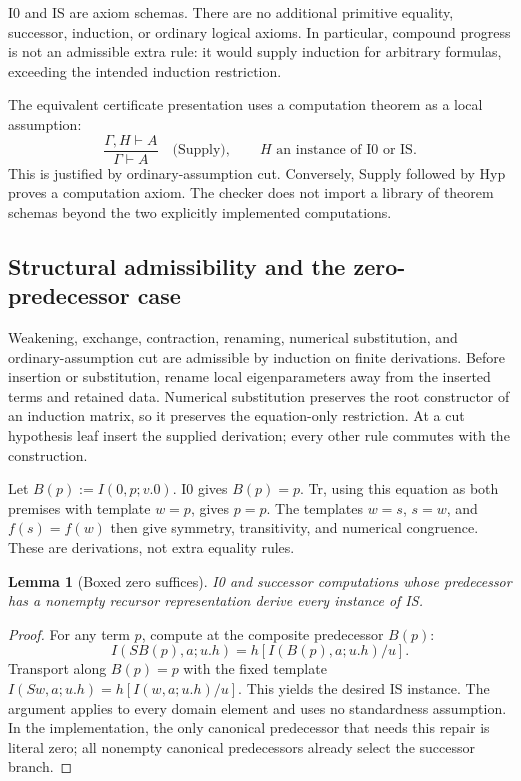 \documentclass[11pt,letterpaper]{article}
\newtheorem{lemma}[theorem]{Lemma}
\theoremstyle{definition}\newtheorem{definition}[theorem]{Definition}
\theoremstyle{remark}\newtheorem{remark}[theorem]{Remark}
\begin{document}
I0 and IS are axiom schemas. There are no additional primitive equality,
successor, induction, or ordinary logical axioms. In particular, compound
progress is not an admissible extra rule: it would supply induction for
arbitrary formulas, exceeding the intended induction restriction.

The equivalent certificate presentation uses a computation theorem as a
local assumption:
\[
 \frac{\Gamma,H\vdash A}{\Gamma\vdash A}\quad\text{(Supply)},
 \qquad H\text{ an instance of I0 or IS}.
\]
This is justified by ordinary-assumption cut. Conversely, Supply followed
by Hyp proves a computation axiom. The checker does not import a library
of theorem schemas beyond the two explicitly implemented computations.

\subsection{Structural admissibility and the zero-predecessor case}

Weakening, exchange, contraction, renaming, numerical substitution, and
ordinary-assumption cut are admissible by induction on finite derivations.
Before insertion or substitution, rename local eigenparameters away from
the inserted terms and retained data. Numerical substitution preserves
the root constructor of an induction matrix, so it preserves the
equation-only restriction. At a cut hypothesis leaf insert the supplied
derivation; every other rule commutes with the construction.

Let $B(p):=I(0,p;v.0)$. I0 gives $B(p)=p$. Tr, using this equation as
both premises with template $w=p$, gives $p=p$. The templates $w=s$,
$s=w$, and $f(s)=f(w)$ then give symmetry, transitivity, and numerical
congruence. These are derivations, not extra equality rules.

\begin{lemma}[Boxed zero suffices]
\label{up:boxing}
I0 and successor computations whose predecessor has a nonempty
recursor representation derive every instance of IS.
\end{lemma}
\begin{proof}
For any term $p$, compute at the composite predecessor $B(p)$:
\[
 I(SB(p),a;u.h)=h[I(B(p),a;u.h)/u].
\]
Transport along $B(p)=p$ with the fixed template
$I(Sw,a;u.h)=h[I(w,a;u.h)/u]$. This yields the desired IS instance.
The argument applies to every domain element and uses no standardness
assumption. In the implementation, the only canonical predecessor that
needs this repair is literal zero; all nonempty canonical predecessors
already select the successor branch.
\end{proof}
\end{document}
